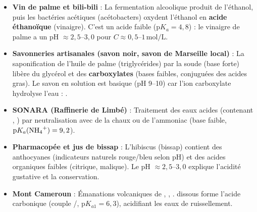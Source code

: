 \documentclass[11pt]{article}
\begin{document}
\begin{savaistu}
\begin{itemize}
  \item \textbf{Vin de palme et bili-bili} : La fermentation alcoolique produit de l'éthanol, puis les bactéries acétiques (acétobacters) oxydent l'éthanol en \textbf{acide éthanoïque} (vinaigre). C'est un acide faible ($\mathrm{p}K_a = 4,8$) : le vinaigre de palme a un pH $\approx 2,5$--$3,0$ pour $C \approx 0,5$--$1\,\text{mol/L}$.
  \item \textbf{Savonneries artisanales (savon noir, savon de Marseille local)} : La saponification de l'huile de palme (triglycérides) par la soude  (base forte) libère du glycérol et des \textbf{carboxylates} (bases faibles, conjuguées des acides gras). Le savon en solution est basique (pH 9--10) car l'ion carboxylate hydrolyse l'eau : .
  \item \textbf{SONARA (Raffinerie de Limbé)} : Traitement des eaux acides (contenant , ) par neutralisation avec de la chaux  ou de l'ammoniac  (base faible, $\mathrm{p}K_a(\ce{NH4+}) = 9,2$).
  \item \textbf{Pharmacopée et jus de bissap} : L'hibiscus (bissap) contient des anthocyanes (indicateurs naturels rouge/bleu selon pH) et des acides organiques faibles (citrique, malique). Le pH $\approx 2,5$--$3,0$ explique l'acidité gustative et la conservation.
  \item \textbf{Mont Cameroun} : Émanations volcaniques de , , .  dissous forme l'acide carbonique  (couple /, $\mathrm{p}K_{a1} = 6,3$), acidifiant les eaux de ruissellement.
\end{itemize}
\end{savaistu}
\end{document}
